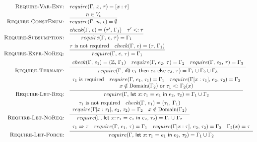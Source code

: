 \documentclass[peerreview, 10pt]{IEEEtran}
\newcommand{\Z}{\ensuremath{\mathbb{Z}}}
\newcommand{\lett}[4]{\ensuremath{\mathsf{let}\ #1\mathsf{:}\,#2\ \mathsf{=}\ #3\ \mathsf{in}\ #4}}
\newcommand{\ternary}[3]{\ensuremath{\mathsf{if0}\ #1\ \mathsf{then}\ #2\ \mathsf{else}\ #3}}
\newcommand{\checktype}[4]{\ensuremath{{check}(#1,\,#2)=(#3,\,#4)}}
\newcommand{\requiretype}[4]{\ensuremath{{require}(#1,\,#2,\,#3)=#4}}
\newcommand{\required}[1]{\ensuremath{#1\text{ is required}}}
\newcommand{\nrequired}[1]{\ensuremath{#1\text{ is not required}}}
\newcommand{\forcerequire}[2]{\ensuremath{#1\Rightarrow#2}}
\begin{document}
\begin{figure*}[ht]
\centering
\begin{framed}
\begin{align*}
\text{\textsc{Require-Var-Env:}} &\quad \requiretype{\Gamma}{x}{\tau}{[x:\tau]} \\
\text{\textsc{Require-ConstEnum:}} &\quad \infer{\requiretype{\Gamma}{n}{\epsilon}{\emptyset}}{n \in V_\epsilon} \\
\text{\textsc{Require-Subsumption:}} &\quad \infer{\requiretype{\Gamma}{e}{\tau}{\Gamma_1}}{\checktype{\Gamma}{e}{\tau'}{\Gamma_1} \quad \tau' <: \tau} \\
\text{\textsc{Require-Expr-NoReq:}} &\quad \infer{\requiretype{\Gamma}{e}{\tau}{\Gamma_1}}{\nrequired{\tau} \quad \checktype{\Gamma}{e}{\tau}{\Gamma_1}} \\
\text{\textsc{Require-Ternary:}} &\quad \infer{\requiretype{\Gamma}{\ternary{e_1}{e_2}{e_3}}{\tau}{\Gamma_1\cup \Gamma_2 \cup \Gamma_3}}{
\begin{array}{c}
\checktype{\Gamma}{e_1}{\Z}{\Gamma_1} \quad
\requiretype{\Gamma}{e_2}{\tau}{\Gamma_2} \quad \requiretype{\Gamma}{e_3}{\tau}{\Gamma_3}
\end{array}
} \\
\text{\textsc{Require-Let-Req:}} &\quad \infer{\requiretype{\Gamma}{\lett{x}{\tau_1}{e_1}{e_2}}{\tau_2}{\Gamma_1 \cup \Gamma_2}}{
\begin{array}{c}
\required{\tau_1} \quad \requiretype{\Gamma}{e_1}{\tau_1}{\Gamma_1} \quad
\requiretype{\Gamma[x:\tau_1]}{e_2}{\tau_2}{\Gamma_2}\\
x \notin \text{Domain}(\Gamma_2) \text{ or } \tau_1 <: \Gamma_2(x)
\end{array}
} \\
\text{\textsc{Require-Let-NoReq:}} &\quad \infer{\requiretype{\Gamma}{\lett{x}{\tau_1}{e_1}{e_2}}{\tau_2}{\Gamma_1 \cup \Gamma_2}}{
\begin{array}{c}
\nrequired{\tau_1} \quad \checktype{\Gamma}{e_1}{\tau_1}{\Gamma_1} \\
\requiretype{\Gamma[x:\tau_1]}{e_2}{\tau_2}{\Gamma_2} \quad x \notin \text{Domain}(\Gamma_2)
\end{array}
} \\
\text{\textsc{Require-Let-Force:}} &\quad \infer{\requiretype{\Gamma}{\lett{x}{\tau_1}{e_1}{e_2}}{\tau_2}{\Gamma_1 \cup \Gamma_2}}{
\begin{array}{c}
\forcerequire{\tau_1}{\tau} \quad \requiretype{\Gamma}{e_1}{\tau}{\Gamma_1} \quad
\requiretype{\Gamma[x:\tau]}{e_2}{\tau_2}{\Gamma_2} \quad \Gamma_2(x) = \tau

\end{array}}
\end{align*}
\end{framed}
\end{figure*}
\end{document}
